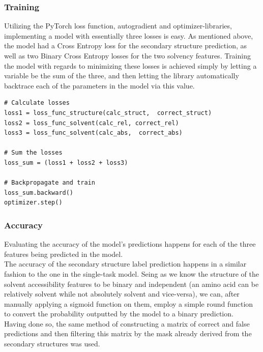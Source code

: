 \begin{multicols}{2}
\subsubsection{Training}
Utilizing the PyTorch loss function, autogradient and optimizer-libraries, implementing a model with essentially three losses is easy. As mentioned above, the model had a Cross Entropy loss for the secondary structure prediction, as well as two Binary Cross Entropy losses for the two solvency features. Training the model with regards to minimizing these losses is achieved simply by letting a variable be the sum of the three, and then letting the library automatically backtrace each of the parameters in the model via this value.
\begin{lstlisting}
# Calculate losses
loss1 = loss_func_structure(calc_struct,  correct_struct)
loss2 = loss_func_solvent(calc_rel, correct_rel)
loss3 = loss_func_solvent(calc_abs,  correct_abs)

# Sum the losses
loss_sum = (loss1 + loss2 + loss3)

# Backpropagate and train
loss_sum.backward()
optimizer.step()
\end{lstlisting}


\subsubsection{Accuracy}
Evaluating the accuracy of the model's predictions happens for each of the three features being predicted in the model.\\
The accuracy of the secondary structure label prediction happens in a similar fashion to the one in the single-task model. Seing as we know the structure of the solvent accessibility features to be binary and independent (an amino acid can be relatively solvent while not absolutely solvent and vice-versa), we can, after manually applying a sigmoid function on them, employ a simple round function to convert the probability outputted by the model to a binary prediction.\\
Having done so, the same method of constructing a matrix of correct and false predictions and then filtering this matrix by the mask already derived from the secondary structures was used.



\end{multicols}
